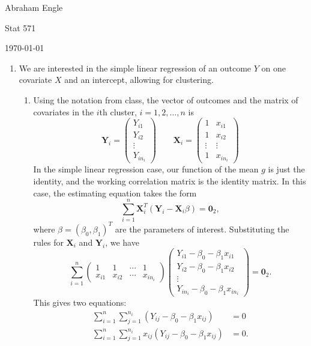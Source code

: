 \documentclass[11pt]{article}
\begin{document}
\pagestyle{empty}
\hfill Abraham Engle

\hfill Stat 571

\hfill \today
\begin{enumerate}
	\item We are interested in the simple linear regression of an outcome $Y$ on one covariate $X$ and an intercept, allowing for clustering.
		\begin{enumerate}
			\item Using the notation from class, the vector of outcomes and the matrix of covariates in the $i$th cluster, $i=1,2,\dotsc,n$ is
			\[
				\bm{Y}_i = \begin{pmatrix}
				Y_{i1} \\ Y_{i2} \\ \vdots \\ Y_{in_i}
				\end{pmatrix}\quad\quad \bm{X}_i = \begin{pmatrix}
				1 & x_{i1} \\ 1 & x_{i2} \\ \vdots & \vdots \\
				1 & x_{in_i}
				\end{pmatrix}
			\]
			In the simple linear regression case, our function of the mean $g$ is just the identity, and the working correlation matrix is the identity matrix. In this case, the estimating equation takes the form
			\[
				\sum_{i=1}^n \bm{X}_i^T(\bm{Y}_i-\bm{X}_i\beta) = \bm{0}_2,
			\]
			where $\beta = (\beta_0,\beta_1)^T$ are the parameters of interest. Substituting the rules for $\bm{X}_i$ and $\bm{Y}_i$, we have
			\[
				\sum_{i=1}^n \begin{pmatrix}
				1 & 1 & \cdots & 1 \\
				x_{i1} & x_{i2} & \cdots & x_{in_i}
				\end{pmatrix}\begin{pmatrix}
				Y_{i1} - \beta_0 - \beta_1 x_{i1} \\ Y_{i2} - \beta_0 - \beta_1x_{i2} \\ \vdots \\ Y_{in_i} - \beta_0 - \beta_1x_{in_i}
				\end{pmatrix} = \bm{0}_2.
			\]
			This gives two equations:
			\begin{align*}
				\sum_{i=1}^n \sum_{j=1}^{n_i}(Y_{ij} - \beta_0 - \beta_1 x_{ij}) &= 0\\
				\sum_{i=1}^n \sum_{j=1}^{n_i}x_{ij}(Y_{ij} - \beta_0 - \beta_1 x_{ij}) &= 0.
			\end{align*}

\end{enumerate}
\end{enumerate}
\end{document}
